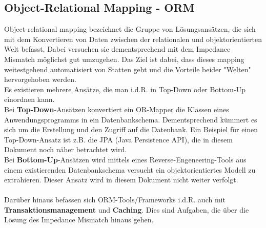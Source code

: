 \subsection{Object-Relational Mapping - ORM}
Object-relational mapping bezeichnet die Gruppe von Lösungsansätzen, die sich mit dem Konvertieren von Daten zwischen der relationalen und objektorientierten Welt befasst. Dabei versuchen sie dementsprechend mit dem Impedance Mismatch möglichst gut umzugehen. Das Ziel ist dabei, dass dieses mapping weitestgehend automatisiert von Statten geht und die Vorteile beider "Welten" hervorgehoben werden.\\
Es existieren mehrere Ansätze, die man i.d.R. in Top-Down oder Bottom-Up einordnen kann.\\
Bei \textbf{Top-Down}-Ansätzen konvertiert ein OR-Mapper die Klassen eines Anwendungsprogramms in ein Datenbankschema. Dementsprechend kümmert es sich um die Erstellung und den Zugriff auf die Datenbank. Ein Beispiel für einen Top-Down-Ansatz ist z.B. die JPA (Java Persistence API), die in diesem Dokument noch näher betrachtet wird.\\
Bei \textbf{Bottom-Up}-Ansätzen wird mittels eines Reverse-Engeneering-Tools aus einem existierenden Datenbankschema versucht ein objektorientiertes Modell zu extrahieren. Dieser Ansatz wird in diesem Dokument nicht weiter verfolgt.\\
\\
Darüber hinaus befassen sich ORM-Tools/Frameworks i.d.R. auch mit \textbf{Transaktionsmanagement} und \textbf{Caching}. Dies sind Aufgaben, die über die Lösung des Impedance Mismatch hinaus gehen.
